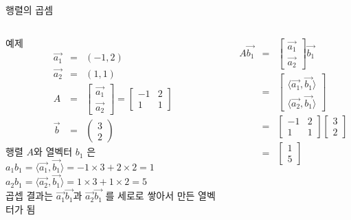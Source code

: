 \documentclass[10pt,t]{beamer}
\begin{document}
\begin{frame}{행렬의 곱셈}
 \pagebreak
 \begin{columns}
     예제
     \begin{eqnarray*}
         \vec{a_1} &=& (-1, 2) \\
         \vec{a_2} &=& (1, 1) \\
         A &=& \begin{bmatrix}
            \vec{a_1}\\
            \vec{a_2}
        \end{bmatrix}
        =\begin{bmatrix}
            -1 & 2 \\
            1 & 1
        \end{bmatrix} \\[1em]
        \vec{b} &=& \begin{pmatrix}
            3 \\
            2
        \end{pmatrix}
     \end{eqnarray*}
     행렬 $A$와 열벡터 $b_1$ 은 \\
     $a_1 b_1 = \langle \vec{a_1}, \vec{b_1} \rangle = -1 \times 3 + 2 \times 2 = 1$\\
     $a_2 b_1 = \langle \vec{a_2}, \vec{b_1} \rangle = 1 \times 3 + 1 \times 2 = 5$
     \\
     곱셉 결과는 $\vec{a_1}\vec{b_1}$과 $\vec{a_2}\vec{b_1}$ 를 세로로 쌓아서 만든 열벡터가 됨

     \begin{eqnarray*}
         A \vec{b_1} &=& \begin{bmatrix}
             \vec{a_1} \\
             \vec{a_2}
         \end{bmatrix} \vec{b_1}\\
         &=& \begin{bmatrix}
            \langle \vec{a_1}, \vec{b_1} \rangle\\
            \langle \vec{a_2}, \vec{b_1} \rangle
         \end{bmatrix}\\
         &=& \begin{bmatrix}
             -1 & 2 \\
             1 & 1 
         \end{bmatrix} 
         \begin{bmatrix}
             3 \\
             2
         \end{bmatrix}\\
         &=& \begin{bmatrix}
             1 \\5
         \end{bmatrix}
     \end{eqnarray*}
 \end{columns}


\end{frame}
\end{document}
